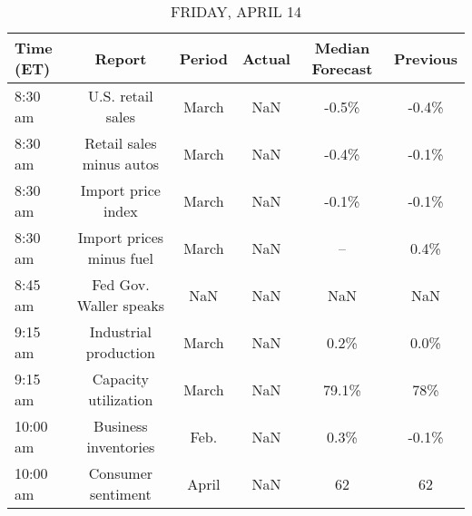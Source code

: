 \documentclass{article}%
\begin{document}
%


\begin{table}[htbp]%
\caption{FRIDAY, APRIL 14}%
\centering%
\begin{adjustbox}{width=1\textwidth}%
\begin{tabular}{lccccc}
\toprule
Time (ET) &                   Report & Period & Actual & Median Forecast & Previous \\
\midrule
  8:30 am &        U.S. retail sales &  March &    NaN &           -0.5\% &    -0.4\% \\
  8:30 am & Retail sales minus autos &  March &    NaN &           -0.4\% &    -0.1\% \\
  8:30 am &       Import price index &  March &    NaN &           -0.1\% &    -0.1\% \\
  8:30 am & Import prices minus fuel &  March &    NaN &              -- &     0.4\% \\
  8:45 am &   Fed Gov. Waller speaks &    NaN &    NaN &             NaN &      NaN \\
  9:15 am &    Industrial production &  March &    NaN &            0.2\% &     0.0\% \\
  9:15 am &     Capacity utilization &  March &    NaN &           79.1\% &      78\% \\
 10:00 am &     Business inventories &   Feb. &    NaN &            0.3\% &    -0.1\% \\
 10:00 am &       Consumer sentiment &  April &    NaN &              62 &       62 \\
\bottomrule
\end{tabular}
%
\end{adjustbox}%
\end{table}
\end{document}
